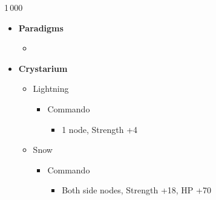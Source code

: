 \begin{multicols}{2}
\begin{shop}{1\,000}
\end{shop}
\begin{menu}
\begin{itemize}
    \item \textbf{Paradigms}
    \begin{itemize}
        \item {}%
{\paradigmline{(\rav)}{\rav}{\rav}}%
{\paradigmline{\com}{\sen}{\med}}%
{\paradigmline[3]{\textit{[\com]}}{\textit{\com}}{\textit{\rav}}}%
{\paradigmline{[\com]}{\com}{\rav}}
    \end{itemize}
    \item \textbf{Crystarium}
    \begin{itemize}
        \item Lightning
        \begin{itemize}
            \item Commando
            \begin{itemize}
                \item 1 node, Strength +4
            \end{itemize}
        \end{itemize}
        \item Snow
        \begin{itemize}
            \item Commando
            \begin{itemize}
                \item Both side nodes, Strength +18, HP +70
            \end{itemize}
        \end{itemize}
    \end{itemize}
    

\end{itemize}
\end{menu}
\end{multicols}
